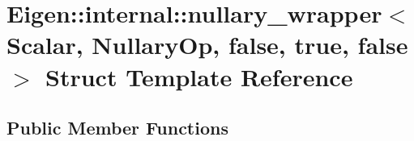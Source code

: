 \hypertarget{struct_eigen_1_1internal_1_1nullary__wrapper_3_01_scalar_00_01_nullary_op_00_01false_00_01true_00_01false_01_4}{}\section{Eigen\+:\+:internal\+:\+:nullary\+\_\+wrapper$<$ Scalar, Nullary\+Op, false, true, false $>$ Struct Template Reference}
\label{struct_eigen_1_1internal_1_1nullary__wrapper_3_01_scalar_00_01_nullary_op_00_01false_00_01true_00_01false_01_4}
\subsection*{Public Member Functions}
